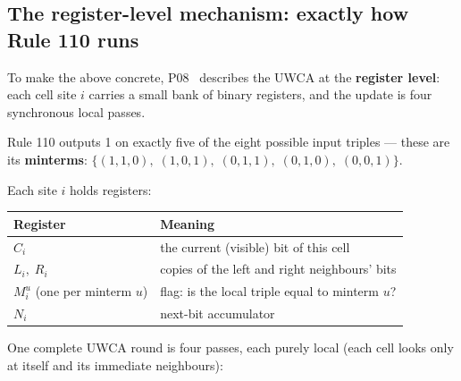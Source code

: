 \documentclass[11pt,a4paper]{article}
\newcommand{\term}[1]{\textbf{#1}}
\begin{document}
\subsection{The register-level mechanism: exactly how Rule 110 runs}

To make the above concrete, P08~\cite{SpivackUGP2025} describes the UWCA at the \term{register
level}: each cell site $i$ carries a small bank of binary registers, and
the update is four synchronous local passes.

Rule 110 outputs 1 on exactly five of the eight possible input triples —
these are its \term{minterms}: $\{(1,1,0),\; (1,0,1),\; (0,1,1),\; (0,1,0),\; (0,0,1)\}$.

Each site $i$ holds registers:
\begin{center}
\begin{tabular}{ll}
\toprule
Register & Meaning \\
\midrule
$C_i$ & the current (visible) bit of this cell \\
$L_i,\; R_i$ & copies of the left and right neighbours' bits \\
$M^u_i$ (one per minterm $u$) & flag: is the local triple equal to minterm $u$? \\
$N_i$ & next-bit accumulator \\
\bottomrule
\end{tabular}
\end{center}

One complete UWCA round is four passes, each purely local (each cell looks
only at itself and its immediate neighbours):
\end{document}

